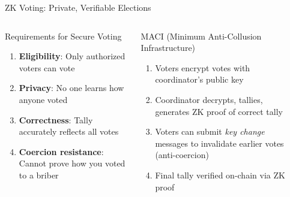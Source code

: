 \documentclass[8pt,aspectratio=169]{beamer}
\begin{document}
\begin{frame}{ZK Voting: Private, Verifiable Elections}
\begin{columns}[T]
\begin{block}{\footnotesize Requirements for Secure Voting}
\footnotesize
\begin{enumerate}
\item \textbf{Eligibility}: Only authorized voters can vote
\item \textbf{Privacy}: No one learns how anyone voted
\item \textbf{Correctness}: Tally accurately reflects all votes
\item \textbf{Coercion resistance}: Cannot prove how you voted to a briber
\end{enumerate}
\end{block}
\vspace{0.1cm}
\begin{exampleblock}{\footnotesize MACI (Minimum Anti-Collusion Infrastructure)}
\footnotesize
\begin{enumerate}
\item Voters encrypt votes with coordinator's public key
\item Coordinator decrypts, tallies, generates ZK proof of correct tally
\item Voters can submit \emph{key change} messages to invalidate earlier votes (anti-coercion)
\item Final tally verified on-chain via ZK proof
\end{enumerate}
\end{exampleblock}
\begin{center}
\end{center}
\end{columns}
\end{frame}
\end{document}
